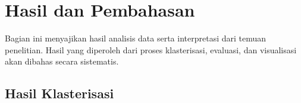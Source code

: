 \section{Hasil dan Pembahasan}
Bagian ini menyajikan hasil analisis data serta interpretasi dari temuan penelitian. Hasil yang diperoleh dari proses klasterisasi, evaluasi, dan visualisasi akan dibahas secara sistematis.

\subsection{Hasil Klasterisasi}
